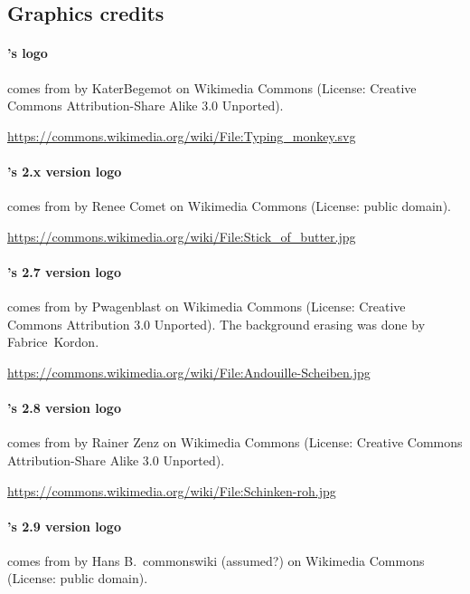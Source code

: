 \subsection*{Graphics credits}

\paragraph{\imitator{}'s logo} comes from  by KaterBegemot on Wikimedia Commons
	(License: Creative Commons Attribution-Share Alike 3.0 Unported).

\url{https://commons.wikimedia.org/wiki/File:Typing_monkey.svg}


\paragraph{\imitator{}'s 2.x version logo} comes from  by Renee Comet on Wikimedia Commons
	(License: public domain).

\url{https://commons.wikimedia.org/wiki/File:Stick_of_butter.jpg}

\paragraph{\imitator{}'s 2.7 version logo} comes from  by Pwagenblast on Wikimedia Commons
	(License: Creative Commons Attribution 3.0 Unported).
The background erasing was done by Fabrice~Kordon.

\url{https://commons.wikimedia.org/wiki/File:Andouille-Scheiben.jpg}


\paragraph{\imitator{}'s 2.8 version logo} comes from  by Rainer Zenz on Wikimedia Commons
	(License: Creative Commons Attribution-Share Alike 3.0 Unported).

\url{https://commons.wikimedia.org/wiki/File:Schinken-roh.jpg}


\paragraph{\imitator{}'s 2.9 version logo} comes from  by Hans B.~commonswiki (assumed?) on Wikimedia Commons
	(License: public domain).

